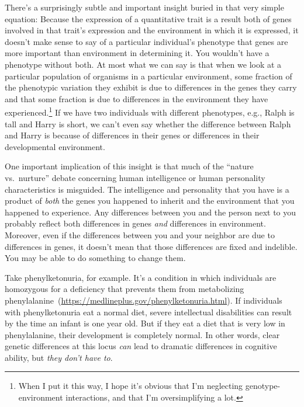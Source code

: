 \documentclass[12pt]{article}
\begin{document}
There's a surprisingly subtle and important insight buried in that
very simple equation: Because the expression of a quantitative trait
is a result both of genes involved in that trait's expression and the
environment in which it is expressed, it doesn't make sense to say of
a particular individual's phenotype that genes are more important than
environment in determining it. You wouldn't have a phenotype without
both. At most what we can say is that when we look at a particular
population of organisms in a particular environment, some fraction of
the phenotypic variation they exhibit is due to differences in the
genes they carry and that some fraction is due to differences in the
environment they have experienced.\footnote{When I put it this way, I
  hope it's obvious that I'm neglecting genotype-environment
  interactions, and that I'm oversimplifying a lot.} If we have two individuals with different phenotypes, e.g.,
Ralph is tall and Harry is short, we can't even say whether the
difference between Ralph and Harry is because of differences in their
genes or differences in their developmental environment.

One important implication of this insight is that much of the ``nature
vs.\ nurture'' debate concerning human intelligence or human
personality characteristics is misguided. The intelligence and
personality that you have is a product of {\it both} the genes you
happened to inherit and the environment that you happened to
experience. Any differences between you and the person next to you
probably reflect both differences in genes {\it and\/} differences in
environment. Moreover, even if the differences between you and your
neighbor are due to differences in genes, it doesn't mean that those
differences are fixed and indelible. You may be able to do something
to change them.

Take phenylketonuria, for example. It's a condition in which
individuals are homozygous for a deficiency that prevents them from
metabolizing
phenylalanine~(\url{https://medlineplus.gov/phenylketonuria.html}).
If individuals with phenylketonuria eat a normal diet, severe
intellectual disabilities can result by the time an infant is one year
old. But if they eat a diet that is very low in phenylalanine, their
development is completely normal.\index{phenylketonuria} In other
words, clear genetic differences at this locus {\it can\/} lead to
dramatic differences in cognitive ability, but {\it they don't have
  to}.
\end{document}
